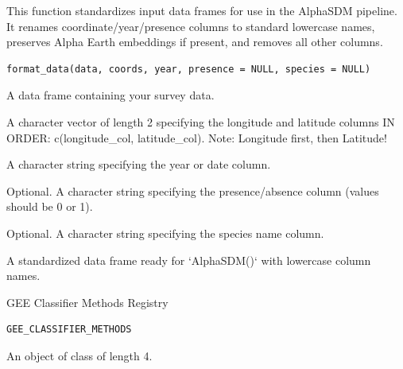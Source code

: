 \documentclass[letterpaper]{book}
\begin{document}
%
\begin{Description}
This function standardizes input data frames for use in the AlphaSDM pipeline.
It renames coordinate/year/presence columns to standard lowercase names,
preserves Alpha Earth embeddings if present, and removes all other columns.
\end{Description}
%
\begin{Usage}
\begin{verbatim}
format_data(data, coords, year, presence = NULL, species = NULL)
\end{verbatim}
\end{Usage}
%
\begin{Arguments}
\begin{ldescription}
\item[\code{data}] A data frame containing your survey data.

\item[\code{coords}] A character vector of length 2 specifying the longitude and latitude columns IN ORDER: c(longitude\_col, latitude\_col). Note: Longitude first, then Latitude!

\item[\code{year}] A character string specifying the year or date column.

\item[\code{presence}] Optional. A character string specifying the presence/absence column (values should be 0 or 1).

\item[\code{species}] Optional. A character string specifying the species name column.
\end{ldescription}
\end{Arguments}
%
\begin{Value}
A standardized data frame ready for `AlphaSDM()` with lowercase column names.
\end{Value}
%
\begin{Description}
GEE Classifier Methods Registry
\end{Description}
%
\begin{Usage}
\begin{verbatim}
GEE_CLASSIFIER_METHODS
\end{verbatim}
\end{Usage}
%
\begin{Format}
An object of class  of length 4.
\end{Format}
\end{document}

